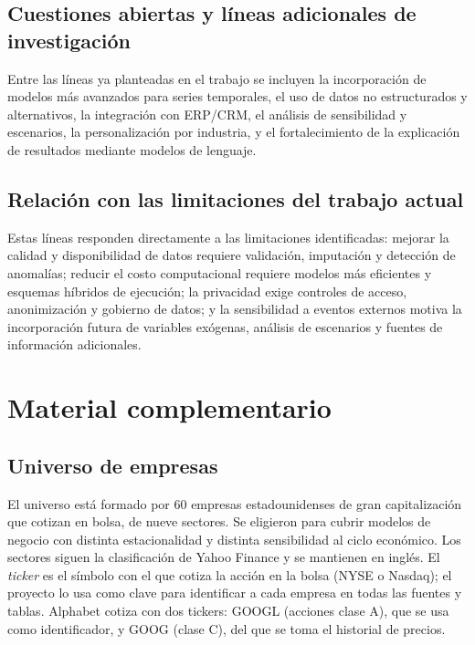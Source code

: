 \documentclass[12pt,letterpaper,oneside]{report}
\renewcommand{\_}{\UnderscoreOriginal\allowbreak}
\begin{document}
\section{Cuestiones abiertas y líneas adicionales de investigación}
Entre las líneas ya planteadas en el trabajo se incluyen la incorporación de modelos más avanzados para series temporales, el uso de datos no estructurados y alternativos, la integración con ERP/CRM, el análisis de sensibilidad y escenarios, la personalización por industria, y el fortalecimiento de la explicación de resultados mediante modelos de lenguaje.

\section{Relación con las limitaciones del trabajo actual}
Estas líneas responden directamente a las limitaciones identificadas: mejorar la calidad y disponibilidad de datos requiere validación, imputación y detección de anomalías; reducir el costo computacional requiere modelos más eficientes y esquemas híbridos de ejecución; la privacidad exige controles de acceso, anonimización y gobierno de datos; y la sensibilidad a eventos externos motiva la incorporación futura de variables exógenas, análisis de escenarios y fuentes de información adicionales.

\appendix
\chapter{Material complementario}
\label{ap:datos}

\section{Universo de empresas}

El universo está formado por 60 empresas estadounidenses de gran capitalización que cotizan en bolsa, de nueve sectores. Se eligieron para cubrir modelos de negocio con distinta estacionalidad y distinta sensibilidad al ciclo económico. Los sectores siguen la clasificación de Yahoo Finance y se mantienen en inglés. El \emph{ticker} es el símbolo con el que cotiza la acción en la bolsa (NYSE o Nasdaq); el proyecto lo usa como clave para identificar a cada empresa en todas las fuentes y tablas. Alphabet cotiza con dos tickers: GOOGL (acciones clase A), que se usa como identificador, y GOOG (clase C), del que se toma el historial de precios.
\end{document}
